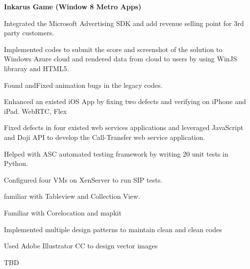 \documentclass[a4paper]{lyu-resume} %
\begin{document}
\begin{minipage}[t]{0.66\textwidth}
\vspace{2 mm}
\textbf{Inkarus Game (Window 8 Metro Apps)}
\begin{tightitemize}
\item Integrated the Microsoft Advertising SDK and add revenue selling point for 3rd party customers. 
\item Implemented codes to submit the score and screenshot of the solution to Windows Azure cloud and rendered data from cloud to users by using WinJS libraray and HTML5.
\item Found andFixed animation bugs in the legacy codes.
\end{tightitemize}

\sectionspace %



\begin{tightitemize}
\item Enhanced an existed iOS App by fixing two defects and verifying on iPhone and iPad. WebRTC, Flex
\item Fixed defects in four existed web services applications and leveraged JavaScript and Doji API to develop the Call-Transfer web service application. 
\item Helped with ASC automated testing framework by writing 20 unit tests in Python.
\item Configured four VMs on XenServer to run SIP tests.
\end{tightitemize}


\begin{tightitemize}
\item familiar with Tableview and Collection View. 
\item Familiar with Corelocation and mapkit
\item Implemented multiple design patterns to maintain clean and clean codes
\item Used Adobe Illustrator CC to design vector images
\end{tightitemize}

\begin{tightitemize}
\item TBD
\end{tightitemize}


\end{minipage}
\end{document}
